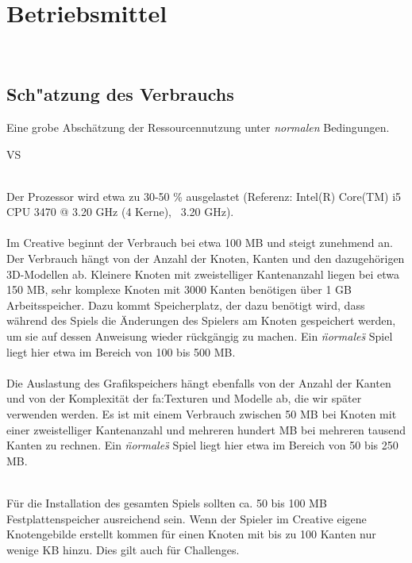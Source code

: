 %
%


\chapter{Betriebsmittel}
\label{BM}~\\

\section{Sch{"a}tzung des Verbrauchs}
\label{BM:Verbrauch}

Eine grobe Abschätzung der Ressourcennutzung unter \textit{normalen} Bedingungen.\\

\begin{ids}{\gls{VS}}

	 \hfill\\

	Der Prozessor wird etwa zu 30-50 \% ausgelastet (Referenz: Intel(R) Core(TM) i5 CPU 3470 @ 3.20 GHz (4 Kerne), ~3.20 GHz).\\
	
	 \hfill\\
	
	Im Creative beginnt der Verbrauch bei etwa 100 MB und steigt zunehmend an. Der Verbrauch hängt von der Anzahl der Knoten, Kanten und den dazugehörigen 3D-Modellen ab. Kleinere Knoten mit zweistelliger Kantenanzahl	liegen bei etwa 150 MB, sehr komplexe Knoten mit 3000 Kanten benötigen über 1 GB Arbeitsspeicher. Dazu kommt Speicherplatz, der dazu benötigt wird, dass während des Spiels die Änderungen des Spielers am Knoten gespeichert werden, um sie auf dessen Anweisung wieder rückgängig zu machen. Ein \textit{\"normales\"} Spiel liegt hier etwa im Bereich von 100 bis 500 MB.\\

	 \hfill\\
	
	Die Auslastung des Grafikspeichers hängt ebenfalls von der Anzahl der Kanten und von der Komplexität der \gls{fa:Textur}en und Modelle ab, die wir später verwenden werden. Es ist mit einem Verbrauch zwischen 50 MB bei Knoten mit einer zweistelliger Kantenanzahl und mehreren hundert MB bei mehreren tausend Kanten zu rechnen.
	Ein \textit{\"normales\"} Spiel liegt hier etwa im Bereich von 50 bis 250 MB.


\clearpage


	 \hfill\\
		
	Für die Installation des gesamten Spiels sollten ca. 50 bis 100 MB Festplattenspeicher ausreichend sein. Wenn der Spieler im Creative eigene Knotengebilde erstellt kommen für einen Knoten mit bis zu 100 Kanten nur wenige KB hinzu. Dies gilt auch für Challenges.\\

\end{ids}


